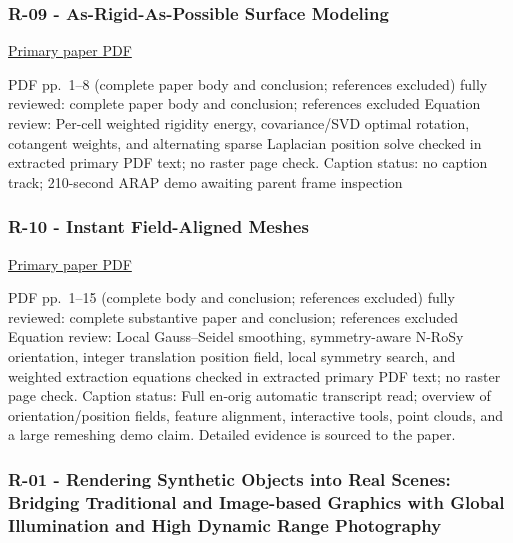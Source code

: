 \subsubsection{R-09 - As-Rigid-As-Possible Surface Modeling}\label{04-visual-computing-ii-ch036-r-09---as-rigid-as-possible-surface-modeling}

\hypertarget{04-visual-computing-ii-ch036-r-09---as-rigid-as-possible-surface-modeling}{}

\href{https://igl.ethz.ch/projects/ARAP/arap_web.pdf}{Primary paper PDF}

PDF pp.~1--8 (complete paper body and conclusion; references excluded) fully reviewed: complete paper body and conclusion; references excluded Equation review: Per-cell weighted rigidity energy, covariance/SVD optimal rotation, cotangent weights, and alternating sparse Laplacian position solve checked in extracted primary PDF text; no raster page check. Caption status: no caption track; 210-second ARAP demo awaiting parent frame inspection

\subsubsection{R-10 - Instant Field-Aligned Meshes}\label{04-visual-computing-ii-ch036-r-10---instant-field-aligned-meshes}

\hypertarget{04-visual-computing-ii-ch036-r-10---instant-field-aligned-meshes}{}

\href{https://igl.ethz.ch/projects/instant-meshes/instant-meshes-SA-2015-jakob-et-al-compressed.pdf}{Primary paper PDF}

PDF pp.~1--15 (complete body and conclusion; references excluded) fully reviewed: complete substantive paper and conclusion; references excluded Equation review: Local Gauss--Seidel smoothing, symmetry-aware N-RoSy orientation, integer translation position field, local symmetry search, and weighted extraction equations checked in extracted primary PDF text; no raster page check. Caption status: Full en-orig automatic transcript read; overview of orientation/position fields, feature alignment, interactive tools, point clouds, and a large remeshing demo claim. Detailed evidence is sourced to the paper.

\subsubsection{R-01 - Rendering Synthetic Objects into Real Scenes: Bridging Traditional and Image-based Graphics with Global Illumination and High Dynamic Range Photography}\label{04-visual-computing-ii-ch036-r-01---rendering-synthetic-objects-into-real-scenes-bridging-traditional-and-image-based-graphics-with-global-illumination-and-high-dynamic-range-photography}


